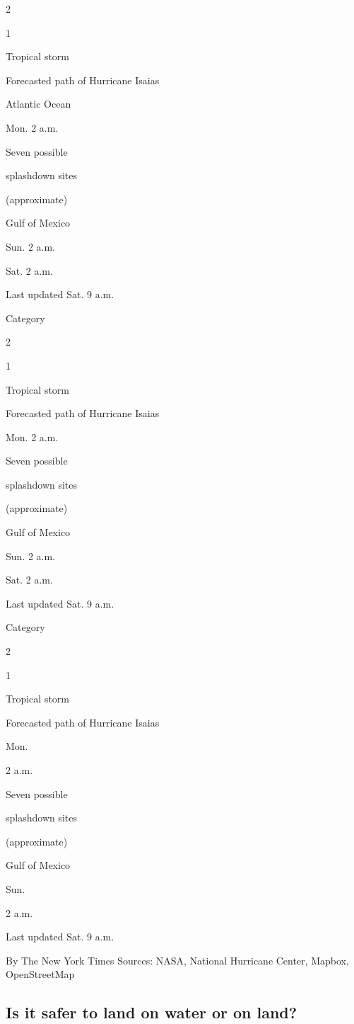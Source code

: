 2

1

Tropical storm

Forecasted path of Hurricane Isaias

Atlantic Ocean

Mon. 2 a.m.

Seven possible

splashdown sites

(approximate)

Gulf of Mexico

Sun. 2 a.m.

Sat. 2 a.m.

Last updated Sat. 9 a.m.

Category

2

1

Tropical storm

Forecasted path of Hurricane Isaias

Mon. 2 a.m.

Seven possible

splashdown sites

(approximate)

Gulf of Mexico

Sun. 2 a.m.

Sat. 2 a.m.

Last updated Sat. 9 a.m.

Category

2

1

Tropical storm

Forecasted path of Hurricane Isaias

Mon.

2 a.m.

Seven possible

splashdown sites

(approximate)

Gulf of Mexico

Sun.

2 a.m.

Last updated Sat. 9 a.m.

By The New York Times \textbar{} Sources: NASA, National Hurricane
Center, Mapbox, OpenStreetMap

\hypertarget{is-it-safer-to-land-on-water-or-on-land}{%
\subsection{Is it safer to land on water or on
land?}\label{is-it-safer-to-land-on-water-or-on-land}}

